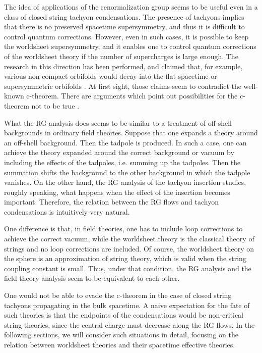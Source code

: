 \documentclass[a4paper,a4paper]{article}
\begin{document}
The idea of applications of the renormalization group seems to be useful even in a class of closed string tachyon 
condensations. 
The presence of tachyons implies that there is no preserved spacetime supersymmetry, and thus it is difficult to 
control quantum corrections. 
However, even in such cases, it is possible to keep the worldsheet supersymmetry, and it enables one to control 
quantum corrections of the worldsheet theory if the number of supercharges is large enough. 
The research in this direction has been performed, and claimed that, for example, various non-compact orbifolds 
would decay into the flat spacetime or supersymmetric orbifolds \cite{Vafa}\cite{HKMM}. 
At first sight, those claims seem to contradict the well-known c-theorem. 
There are arguments which point out possibilities for the c-theorem not to be true \cite{APS}\cite{HKMM}. 

\vspace{2mm}

What the RG analysis does seems to be similar to a treatment of off-shell backgrounds in ordinary field theories. 
Suppose that one expands a theory around an off-shell background. 
Then the tadpole is produced. 
In such a case, one can achieve the theory expanded around the correct background or vacuum by including the 
effects of the tadpoles, i.e. summing up the tadpoles. 
Then the summation shifts the background to the other background in which the tadpole vanishes. 
On the other hand, the RG analysis of the tachyon insertion studies, roughly speaking, what happens when the 
effect of the insertion becomes important. 
Therefore, the relation between the RG flows and tachyon condensations is intuitively very natural. 

One difference is that, in field theories, one has to include loop corrections to achieve the correct vacuum, 
while the worldsheet theory is the classical theory of strings and no loop corrections are included. 
Of course, the worldsheet theory on the sphere is an approximation of string theory, which is valid when the 
string coupling constant is small. 
Thus, under that condition, the RG analysis and the field theory analysis seem to be equivalent to each other. 

\vspace{2mm}

One would not be able to evade the c-theorem in the case of closed string tachyons propagating in the bulk 
spacetime. 
A naive expectation for the fate of such theories is that the endpoints of the condensations would be 
non-critical string theories, since the central charge must decrease along the RG flows. 
In the following sections, we will consider such situations in detail, 
focusing on the relation between worldsheet theories 
and their spacetime effective theories. 
\end{document}
